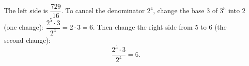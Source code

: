 The left side is $\dfrac{729}{16}$. To cancel the denominator $2^4$, change the base $3$ of $3^5$ into $2$ (one change): $\dfrac{2^5\cdot3}{2^4}=2\cdot3=6$. Then change the right side from $5$ to $6$ (the second change):
\[\boxed{\dfrac{2^5\cdot3}{2^4}=6}.\]
